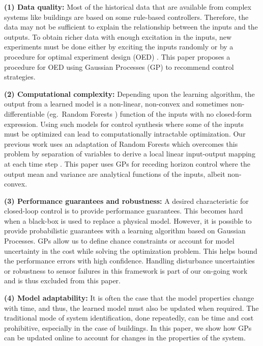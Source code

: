 \noindent \textbf{(1) Data quality:} Most of the historical data that are available from complex systems like buildings are based on some rule-based controllers. 
Therefore, the data may not be sufficient to explain the relationship between the inputs and the outputs. 
To obtain richer data with enough excitation in the inputs, new experiments must be done either by exciting the inputs randomly or by a procedure for optimal experiment design (OED) \cite{Emery1998,Fedorov2010}. 
This paper proposes a procedure for OED using Gaussian Processes (GP) to recommend control strategies.

\noindent \textbf{(2) Computational complexity:} Depending upon the learning algorithm, the output from a learned model is a non-linear, non-convex and sometimes non-differentiable (eg.~Random Forests \cite{Friedman2001}) function of the inputs with no closed-form expression. 
Using such models for control synthesis where some of the inputs must be optimized can lead to computationally intractable optimization. 
Our previous work uses an adaptation of Random Forests which overcomes this problem by separation of variables to derive a local linear input-output mapping at each time step \cite{JainCDC2017}.
This paper uses GPs for receding horizon control where the output mean and variance are analytical functions of the inputs, albeit non-convex.

\noindent \textbf{(3) Performance guarantees and robustness:} A desired characteristic for closed-loop control is to provide performance guarantees. 
This becomes hard when a black-box is used to replace a physical model. 
However, it is possible to provide probabilistic guarantees with a learning algorithm based on Gaussian Processes. 
GPs allow us to define chance constraints or account for model uncertainty in the cost while solving the optimization problem. This helps bound the performance errors with high confidence. 
Handling disturbance uncertainties or robustness to sensor failures in this framework is part of our on-going work and is thus excluded from this paper.

\noindent \textbf{(4) Model adaptability:} It is often the case that the model properties change with time, %
and thus, the learned model must also be updated when required. 
The traditional mode of system identification, done repeatedly, can be time and cost prohibitive, especially in the case of buildings. 
In this paper, we show how GPs can be updated online to account for %
changes in the properties of the system.

